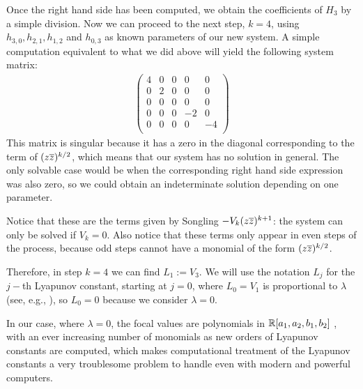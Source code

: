 Once the right hand side has been computed, we obtain the coefficients of $H_3$ by a simple division. Now we can proceed to the next step, $k=4$, using $h_{3,0},h_{2,1},h_{1,2}$ and $h_{0,3}$ as known parameters of our new system. A simple computation equivalent to what we did above will yield the following system matrix:
\begin{align*}
\begin{pmatrix}
4 & 0 & 0 & 0 & 0\\
0 & 2 & 0 & 0 & 0\\
0 & 0 & 0 & 0 & 0\\
0 & 0 & 0 & -2 & 0\\
0 & 0 & 0 & 0 & -4\\
\end{pmatrix}
\end{align*}
This matrix is singular because it has a zero in the diagonal corresponding to the term of $(z\overline{z})^{k/2}$, which means that our system has no solution in general. The only solvable case would be when the corresponding right hand side expression was also zero, so we could obtain an indeterminate solution depending on one parameter.

\begin{observacio}
Notice that these are the terms given by Songling $-V_k(z\overline{z})^{k+1}$: the system can only be solved if $V_k=0$. Also notice that these terms only appear in even steps of the process, because odd steps cannot have a monomial of the form $(z\overline{z})^{k/2}$.
\end{observacio}

Therefore, in step $k=4$ we can find $L_1:=V_3$. We will use the notation $L_j$ for the $j-$th Lyapunov constant, starting at $j=0$, where $L_0=V_1$ is proportional to $\lambda$ (see, e.g., ), so $L_0=0$ because we consider $\lambda=0$.

\begin{observacio}
In our case, where $\lambda=0$, the focal values are polynomials in $\mathbb{R}[a_1,a_2,b_1,b_2]$ \parencite{Dumortier2006}, with an ever increasing number of monomials as new orders of Lyapunov constants are computed, which makes computational treatment of the Lyapunov constants a very troublesome problem to handle even with modern and powerful computers.
\end{observacio}

